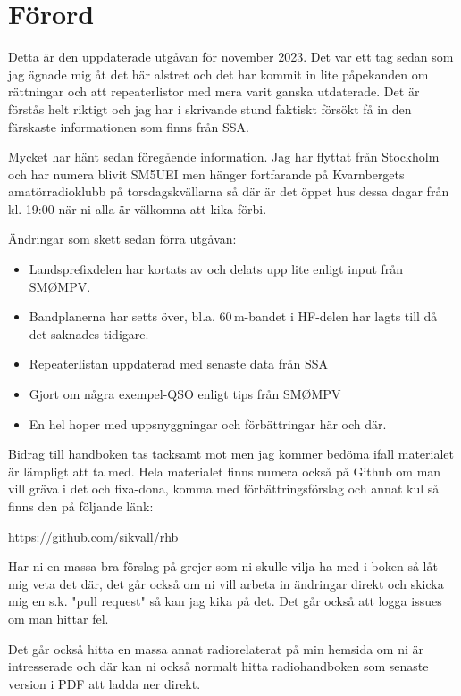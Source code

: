 \section*{Förord}
	
Detta är den uppdaterade utgåvan för november 2023. Det var ett tag
sedan som jag ägnade mig åt det här alstret och det har kommit in lite
påpekanden om rättningar och att repeaterlistor med mera varit ganska
utdaterade. Det är förstås helt riktigt och jag har i skrivande stund
faktiskt försökt få in den färskaste informationen som finns från SSA.

Mycket har hänt sedan föregående information. Jag har flyttat från
Stockholm och har numera blivit SM5UEI men hänger fortfarande på
Kvarnbergets amatörradioklubb på torsdagskvällarna så där är det öppet
hus dessa dagar från kl. 19:00 när ni alla är välkomna att kika förbi.

Ändringar som skett sedan förra utgåvan:

\begin{itemize}[]
	\item Landsprefixdelen har kortats av och delats upp lite enligt 
	input från SMØMPV.
	\item Bandplanerna har setts över, bl.a. 60\,m-bandet i HF-delen 
	har lagts till då det saknades tidigare.
	\item Repeaterlistan uppdaterad med senaste data från SSA
	\item Gjort om några exempel-QSO enligt tips från SMØMPV
	\item En hel hoper med uppsnyggningar och förbättringar här och där.
\end{itemize}

Bidrag till handboken tas tacksamt mot men jag kommer bedöma ifall
materialet är lämpligt att ta med.  Hela materialet finns numera också
på Github om man vill gräva i det och fixa-dona, komma med 
förbättrings\-förslag och annat kul så finns den på följande länk:

\href{https://github.com/sikvall/rhb/}{https://github.com/sikvall/rhb}

Har ni en massa bra förslag på grejer som ni skulle vilja ha med i boken
så låt mig veta det där, det går också om ni vill arbeta in ändringar direkt
och skicka mig en s.k. "pull request" så kan jag kika på det. Det går också
att logga issues om man hittar fel.

Det går också hitta en massa annat radiorelaterat på min hemsida om ni 
är intresserade och där kan ni också normalt hitta radiohandboken som 
senaste version i PDF att ladda ner direkt.

